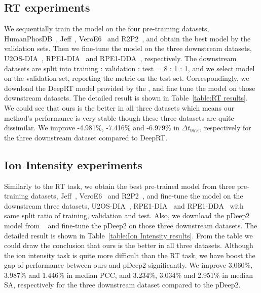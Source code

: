 \subsection{RT experiments}
We sequentially train the model on the four pre-training datasets, HumanPhosDB~\cite{lawrence2016plug}, Jeff~\cite{liu2018vivo}, VeroE6~\cite{bouhaddou2020global} and R2P2~\cite{leutert2019r2}, and obtain the best model by the validation sets. Then we fine-tune the model on the three downstream datasets,  U2OS-DIA~\cite{wang2020naguider}, RPE1-DIA~\cite{bekker2020rapid} and RPE1-DDA~\cite{bekker2020rapid}, respectively. 
The downstream datasets are split into training : validation : test = 8 : 1 : 1, and we select model on the validation set, reporting the metric on the test set.  
Correspondingly, we download the DeepRT model provided by the \cite{ma2018improved}, and fine tune the model on those downstream datasets. The detailed result is shown in Table~\ref{table:RT results}. We could see that ours is the better in all three datasets which means our method's performance is very stable though these three datasets are quite dissimilar. We improve -4.981\%, -7.416\% and -6.979\% in $\Delta$$t_{95\%}$, respectively for the three downstream dataset compared to DeepRT. 

\subsection{Ion Intensity experiments}
Similarly to the RT task, we obtain the best pre-trained model from three pre-training datasets,   Jeff~\cite{liu2018vivo}, VeroE6~\cite{bouhaddou2020global} and R2P2~\cite{leutert2019r2}, and fine-tune the model on the downstream three datasets, U2OS-DIA~\cite{wang2020naguider}, RPE1-DIA~\cite{bekker2020rapid} and RPE1-DDA~\cite{bekker2020rapid} with same split ratio of training, validation and test. Also, we download the pDeep2 model from ~\cite{zeng2019ms} and fine-tune the pDeep2 on those three downstream datasets. The detailed result is shown in Table~\ref{table:Ion Intensity results}. From the table we could draw the conclusion that ours is the better in all three datasets. Although the ion intensity task is quite more difficult than the RT task, we have boost the gap of performance between ours and pDeep2 significantly. We improve 3.060\%, 3.987\% and 1.446\% in median PCC, and 3.234\%, 3.034\% and 2.951\% in median SA, respectively for the three downstream dataset compared to the pDeep2.

